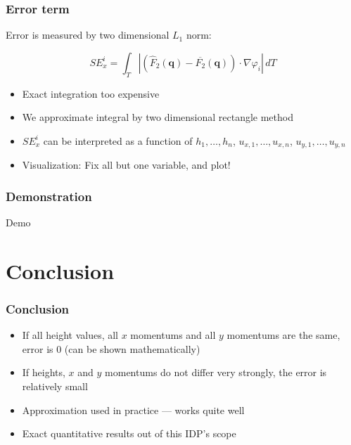 \documentclass{beamer}
\renewcommand{\phi}{\varphi}
\begin{document}
\begin{frame}
  \frametitle{Error term}
  Error is measured by two dimensional $L_1$ norm:
  
  \begin{equation}
    \label{eq:SE-definition}
    SE_x^i = \int_T \left| \left( \widehat F_2 (\mathbf{q}) - \overline{F_2}(\mathbf{q}) \right) \cdot \nabla \phi_i \right| \,dT
  \end{equation}

  \begin{itemize}
  \item Exact integration too expensive
  \item We approximate integral by two dimensional rectangle method
  \item $SE_x^i$ can be interpreted as a function of $h_1,\dots,h_n$, $u_{x,1},\dots,u_{x,n}$, $u_{y,1},\dots,u_{y,n}$
  \item Visualization: Fix all but one variable, and plot!
  \end{itemize}
\end{frame}

\begin{frame}
  \frametitle{Demonstration}
  \centerline{\Large{Demo}}
\end{frame}

\section{Conclusion}
\label{sec:stiffness-conclusion}

\begin{frame}
  \frametitle{Conclusion}
  \begin{itemize}
  \item If all height values, all $x$ momentums and all $y$ momentums are the same, error is 0 (can be shown mathematically)
  \item If heights, $x$ and $y$ momentums do not differ very strongly, the error is relatively small
  \item Approximation used in practice --- works quite well
  \item Exact quantitative results out of this IDP's scope
  \end{itemize}
\end{frame}
\end{document}
